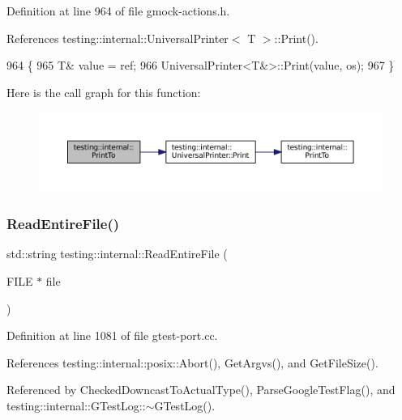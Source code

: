 Definition at line 964 of file gmock-\/actions.\+h.



References testing\+::internal\+::\+Universal\+Printer$<$ T $>$\+::\+Print().


\begin{DoxyCode}
964                                                              \{
965   T& value = ref;
966   UniversalPrinter<T&>::Print(value, os);
967 \}
\end{DoxyCode}
Here is the call graph for this function\+:
\nopagebreak
\begin{figure}[H]
\begin{center}
\leavevmode
\includegraphics[width=350pt]{namespacetesting_1_1internal_a8fd10cc30084c36a89c74868c8bd53f8_cgraph}
\end{center}
\end{figure}
\mbox{\label{namespacetesting_1_1internal_a2cc0be60c54a8701423fe5297e1349ee}} 
\subsubsection{\texorpdfstring{Read\+Entire\+File()}{ReadEntireFile()}}
{\footnotesize\ttfamily std\+::string testing\+::internal\+::\+Read\+Entire\+File (\begin{DoxyParamCaption}\item[{F\+I\+LE $\ast$}]{file }\end{DoxyParamCaption})}



Definition at line 1081 of file gtest-\/port.\+cc.



References testing\+::internal\+::posix\+::\+Abort(), Get\+Argvs(), and Get\+File\+Size().



Referenced by Checked\+Downcast\+To\+Actual\+Type(), Parse\+Google\+Test\+Flag(), and testing\+::internal\+::\+G\+Test\+Log\+::$\sim$\+G\+Test\+Log().



